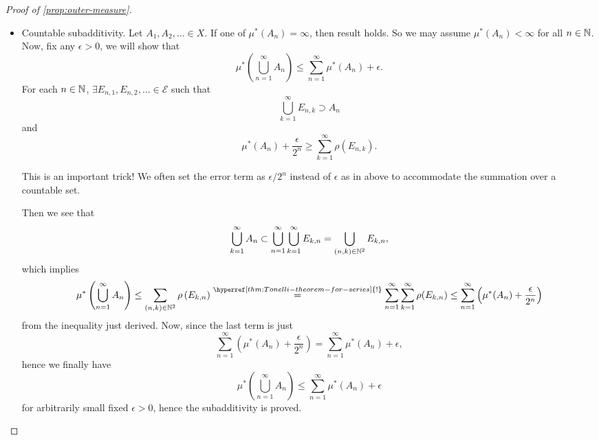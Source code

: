 \begin{proof}[Proof of \autoref{prop:outer-measure}]
\begin{itemize}
		\item Countable subadditivity. Let \(A_1, A_2, \ldots \in X \). If one of \(\mu^{*} (A_{n}) = \infty \), then result holds.
		      So we may assume \(\mu^{*} (A_n)<\infty \) for all \(n\in \mathbb{\MakeUppercase{N}} \). Now, fix any \(\epsilon >0\),
		      we will show that
		      \[
			      \mu^{*} \left(\bigcup\limits_{n=1}^{\infty} A_n\right)\leq \sum\limits_{n=1}^{\infty} \mu^{*} (A_n)+\epsilon.
		      \]
		      For each \(n\in\mathbb{\MakeUppercase{N}} \), \(\exists E_{n, 1}, E_{n, 2}, \ldots \in \mathcal{E}\) such that
		      \[
			      \bigcup\limits_{k=1}^{\infty} E_{n, k}\supset A_n
		      \]
		      and
		      \[
			      \mu^{*} (A_n)+\frac{\epsilon}{2^n} \geq \sum\limits_{k=1}^{\infty} \rho(E_{n, k}).
		      \]
		      \begin{remark}
			      This is an important trick! We often set the error term as \(\epsilon / 2^n\) instead of \(\epsilon \) as in above to accommodate the summation over
			      a countable set.
		      \end{remark}

		      Then we see that
		      \[
			      \bigcup\limits_{k=1}^{\infty} A_n \subset \bigcup\limits_{n=1}^{\infty} \bigcup\limits_{k=1}^{\infty} E_{k, n} = \bigcup\limits_{(n, k)\in\mathbb{\MakeUppercase{N}} ^2} E_{k, n},
		      \]
		      which implies
		      \[
			      \mu^{*} \left(\bigcup\limits_{n=1}^{\infty} A_{n}\right)
			      \leq \sum\limits_{(n, k)\in\mathbb{\MakeUppercase{N}} ^2} \rho\left(E_{k, n}\right)
			      \overset{\hyperref[thm:Tonelli-theorem-for-series]{\text{!}}}{=} \sum\limits_{n=1}^{\infty} \sum\limits_{k=1}^{\infty} \rho(E_{k, n})
			      \leq \sum\limits_{n=1}^{\infty} \left(\mu^{*} (A_n) + \frac{\epsilon}{2^n}\right)
		      \]
		      from the inequality just derived. Now, since the last term is just
		      \[
			      \sum\limits_{n=1}^{\infty} \left(\mu^{*} (A_n) + \frac{\epsilon}{2^n}\right) = \sum\limits_{n=1}^{\infty} \mu^{*} (A_n)+\epsilon,
		      \]
		      hence we finally have
		      \[
			      \mu^{*} \left(\bigcup\limits_{n=1}^{\infty} A_{n}\right)\leq \sum\limits_{n=1}^{\infty} \mu^{*} (A_n)+\epsilon
		      \]
		      for arbitrarily small fixed \(\epsilon >0\), hence the subadditivity is proved.
	\end{itemize}
\end{proof}

